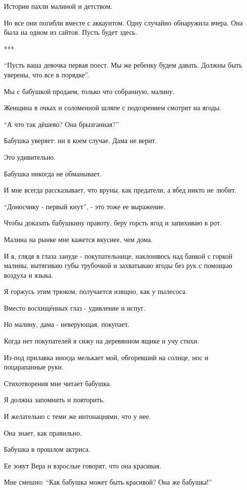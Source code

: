 Истории пахли малиной и детством. 

Но все они  погибли вместе с аккаунтом. Одну случайно обнаружила вчера. Она
была на одном из сайтов. Пусть будет здесь. 

***

\enquote{Пусть ваша девочка первая поест. Мы же ребенку будем давать. Должны
быть уверены, что все в порядке}.

Мы с бабушкой продаем, только что собранную, малину.

Женщина в очках и соломенной  шляпе с подозрением смотрит на ягоды. 

\enquote{А что так дёшево? Она брызганная?}

Бабушка уверяет:  ни в коем случае. Дама не верит.

Это  удивительно. 

Бабушка никогда не обманывает. 

И мне всегда рассказывает, что вруны, как  предатели, а ябед никто не любит.

\enquote{Доносчику - первый кнут}, -  это тоже ее выражение.   

Чтобы доказать бабушкину правоту, беру горсть ягод и запихиваю в рот. 

Малина на рынке мне кажется  вкуснее, чем дома. 

И я, глядя в глаза зануде - покупательнице, наклоняюсь над банкой с горкой
малины, вытягиваю губы трубочкой  и захватываю ягоды без рук с помощью  воздуха
и языка. 

Я горжусь этим трюком,  получается изящно,   как у  пылесоса. 

Вместо восхищённых глаз -  удивление и испуг. 

Но малину,  дама - неверующая, покупает.  

Когда нет покупателей я  сижу на деревянном ящике и учу стихи.

Из-под  прилавка иногда  мелькает  мой, обгоревший на солнце, нос и
поцарапанные руки.  

Стихотворения мне читает бабушка. 

Я должна запомнить и повторить. 

И желательно с теми же интонациями, что у нее. 

Она знает, как правильно.

Бабушка в прошлом актриса.

Ее зовут Вера и взрослые говорят, что она красивая. 

Мне смешно: \enquote{Как бабушка может быть красивой? Она же  бабушка!}

